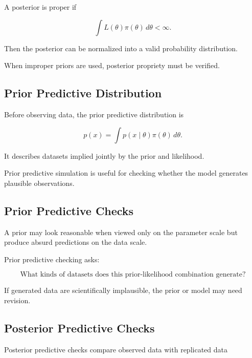 A posterior is proper if

\[
\boxed{
\int
L(\theta)\pi(\theta)
\,d\theta
<
\infty.
}
\]

Then the posterior can be normalized into a valid probability
distribution.

When improper priors are used, posterior propriety must be verified.

\subsection{Prior Predictive Distribution}
\label{subsec:prior-predictive}

Before observing data, the prior predictive distribution is

\[
\boxed{
p(x)
=
\int
p(x\mid\theta)\pi(\theta)\,d\theta.
}
\]

It describes datasets implied jointly by the prior and likelihood.

Prior predictive simulation is useful for checking whether the model
generates plausible observations.

\subsection{Prior Predictive Checks}
\label{subsec:prior-predictive-checks}

A prior may look reasonable when viewed only on the parameter scale but
produce absurd predictions on the data scale.

Prior predictive checking asks:

\[
\boxed{
\text{What kinds of datasets does this prior-likelihood combination
generate?}
}
\]

If generated data are scientifically implausible, the prior or model may
need revision.

\subsection{Posterior Predictive Checks}
\label{subsec:posterior-predictive-checks}

Posterior predictive checks compare observed data with replicated data

